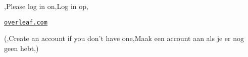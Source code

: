 \begin{frame}
	\titlepage
	\centering

	{\large \lang,Please log in on,Log in op,}

	\vspace{10pt}
	\href{https://www.overleaf.com}{\LARGE\ul{\texttt{overleaf.com}}}

	\vspace{10pt}
	{\scriptsize (\lang,Create an account if you don't have one,Maak een account aan als je er nog geen hebt,)}
\end{frame}